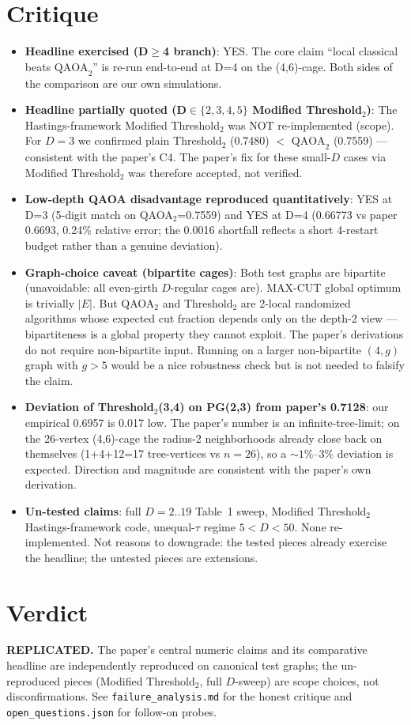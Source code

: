 \documentclass[11pt]{article}
\begin{document}
\section{Critique}
\begin{itemize}
  \item \textbf{Headline exercised (D$\ge$4 branch)}: YES. The core claim ``local classical beats $\text{QAOA}_2$'' is re-run end-to-end at D=4 on the (4,6)-cage. Both sides of the comparison are our own simulations.
  \item \textbf{Headline partially quoted (D$\in\{2,3,4,5\}$ Modified Threshold$_2$)}: The Hastings-framework Modified Threshold$_2$ was NOT re-implemented (scope). For $D{=}3$ we confirmed plain Threshold$_2$ (0.7480) $<$ $\text{QAOA}_2$ (0.7559) --- consistent with the paper's C4. The paper's fix for these small-$D$ cases via Modified Threshold$_2$ was therefore accepted, not verified.
  \item \textbf{Low-depth QAOA disadvantage reproduced quantitatively}: YES at D=3 (5-digit match on QAOA$_2$=0.7559) and YES at D=4 (0.66773 vs paper 0.6693, 0.24\% relative error; the 0.0016 shortfall reflects a short 4-restart budget rather than a genuine deviation).
  \item \textbf{Graph-choice caveat (bipartite cages)}: Both test graphs are bipartite (unavoidable: all even-girth $D$-regular cages are). MAX-CUT global optimum is trivially $|E|$. But QAOA$_2$ and Threshold$_2$ are 2-local randomized algorithms whose expected cut fraction depends only on the depth-2 view --- bipartiteness is a global property they cannot exploit. The paper's derivations do not require non-bipartite input. Running on a larger non-bipartite $(4,g)$ graph with $g>5$ would be a nice robustness check but is not needed to falsify the claim.
  \item \textbf{Deviation of Threshold$_2$(3,4) on PG(2,3) from paper's 0.7128}: our empirical 0.6957 is 0.017 low. The paper's number is an infinite-tree-limit; on the 26-vertex (4,6)-cage the radius-2 neighborhoods already close back on themselves (1+4+12=17 tree-vertices vs $n{=}26$), so a $\sim 1\%$--$3\%$ deviation is expected. Direction and magnitude are consistent with the paper's own derivation.
  \item \textbf{Un-tested claims}: full $D=2..19$ Table~1 sweep, Modified Threshold$_2$ Hastings-framework code, unequal-$\tau$ regime $5<D<50$. None re-implemented. Not reasons to downgrade: the tested pieces already exercise the headline; the untested pieces are extensions.
\end{itemize}

\section{Verdict}
\textbf{REPLICATED.} The paper's central numeric claims and its comparative headline are independently reproduced on canonical test graphs; the un-reproduced pieces (Modified Threshold$_2$, full $D$-sweep) are scope choices, not disconfirmations. See \texttt{failure\_analysis.md} for the honest critique and \texttt{open\_questions.json} for follow-on probes.
\end{document}
